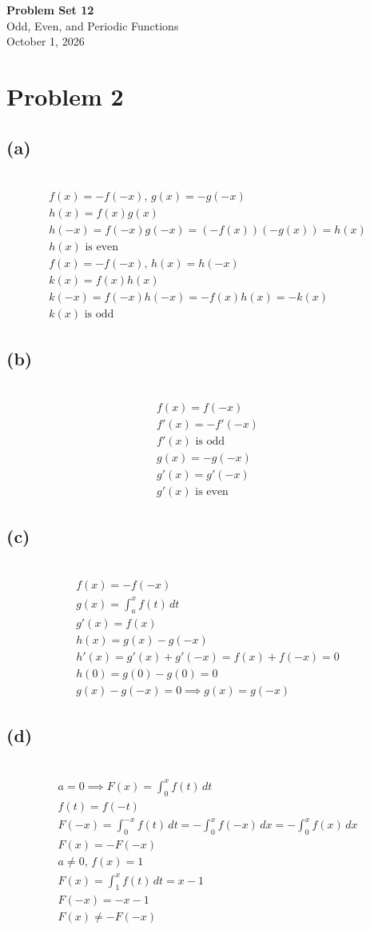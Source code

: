 \documentclass[12pt]{article}
\newcommand{\problem}[1]{\section{Problem #1}}
\newcommand{\subproblem}[1]{\subsection{(#1)} \,}
\begin{document}
\vspace*{0cm}

\begin{center}
    {\Large \bfseries Problem Set 12} \\[0.5cm]
    {\large Odd, Even, and Periodic Functions} \\[0.35cm]
    {\normalsize October 1, 2026}
\end{center}


\problem{2}

\subproblem{a}
\begin{gather*}
    f(x)=-f(-x),\, g(x)=-g(-x)\\
    h(x)=f(x)g(x)\\
    h(-x)=f(-x)g(-x)=(-f(x))(-g(x))=h(x)\\
    \boxed{h(x) \text{ is even}}\\
    f(x)=-f(-x),\, h(x)=h(-x)\\
    k(x)=f(x)h(x)\\
    k(-x)= f(-x)h(-x)=-f(x)h(x)=-k(x)\\
    \boxed{k(x) \text{ is odd}}
\end{gather*}

\subproblem{b}
\begin{gather*}
    f(x)=f(-x)\\
    f'(x)=-f'(-x)\\
    \boxed{f'(x)\text{ is odd}}\\
    g(x)=-g(-x)\\
    g'(x)=g'(-x)\\
    \boxed{g'(x)\text{ is even}}
\end{gather*}

\subproblem{c}
\begin{gather*}
    f(x)=-f(-x)\\
    g(x)=\int_a^x f(t)\, dt\\
    g'(x)=f(x)\\
    h(x)=g(x)-g(-x)\\
    h'(x)=g'(x)+g'(-x)=f(x)+f(-x)=0\\
    h(0)=g(0)-g(0)=0\\
    g(x)-g(-x)=0 \implies \boxed{g(x)=g(-x)}
\end{gather*}

\subproblem{d}
\begin{gather*}
    a=0 \implies F(x)=\int_0^x f(t)\, dt\\
    f(t)=f(-t)\\
    F(-x)=\int_0^{-x} f(t)\, dt= -\int_0^x f(-x)\, dx = -\int_0^x f(x)\, dx \\
    \boxed{F(x)=-F(-x)}\\
    a\ne 0,\, f(x)=1\\
    F(x)=\int_1^x f(t)\, dt = x-1\\
    F(-x) = -x-1\\
    \boxed{F(x)\ne -F(-x)}
\end{gather*}
\end{document}
